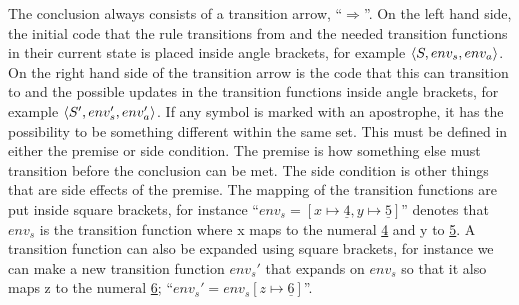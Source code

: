 The conclusion always consists of a transition arrow, \enquote{$\Rightarrow$}. On the left hand side, the initial code that the rule transitions from and the needed transition functions in their current state is placed inside angle brackets, for example $\Braket{S,env_s,env_a}$. On the right hand side of the transition arrow is the code that this can transition to and the possible updates in the transition functions inside angle brackets, for example $\Braket{S',env_s',env_a'}$. If any symbol is marked with an apostrophe, it has the possibility to be something different within the same set. This must be defined in either the premise or side condition.
The premise is how something else must transition before the conclusion can be met. The side condition is other things that are side effects of the premise.
The mapping of the transition functions are put inside square brackets, for instance \enquote{$env_s = [x \mapsto \underline{4},y \mapsto \underline{5}]$} denotes that $env_s$ is the transition function where x maps to the numeral \underline{4} and y to \underline{5}. A transition function can also be expanded using square brackets, for instance we can make a new transition function $env_s'$ that expands on $env_s$ so that it also maps z to the numeral \underline{6}; \enquote{$env_s' = env_s[z \mapsto \underline{6}]$}.







